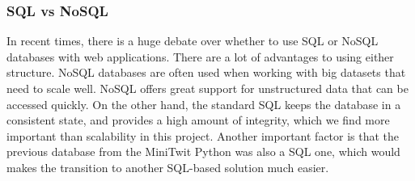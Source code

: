 \subsubsection{SQL vs NoSQL} 
In recent times, there is a huge debate over whether to use SQL or NoSQL databases with web applications. There are a lot of advantages to using either structure. NoSQL databases are often used when working with big datasets that need to scale well. NoSQL offers great support for unstructured data that can be accessed quickly. On the other hand, the standard SQL keeps the database in a consistent state, and provides a high amount of integrity, which we find more important than scalability in this project. Another important factor is that the previous database from the MiniTwit Python was also a SQL one, which would makes the transition to another SQL-based solution much easier.